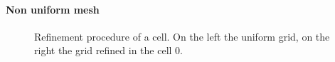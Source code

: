 \documentclass[11pt,a4paper]{article}
\begin{document}
\paragraph{Non uniform mesh}
\begin{figure}\captionsetup[subfloat]{labelformat=empty}
	\caption{Refinement procedure of a cell. On the left the uniform grid, on the right the grid refined in the cell 0.}
	\label{fig:octant_refinement}
\end{figure}\captionsetup[subfloat]{labelformat=parens}
\end{document}
